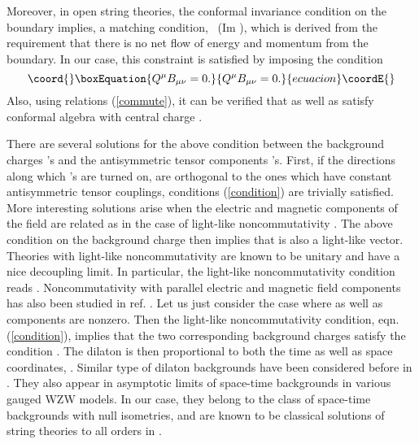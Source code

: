\documentclass[a4paper,12pt]{article}
\begin{document}
Moreover, in open string theories, the conformal invariance condition 
on the boundary implies, a matching 
condition, \coordHE{} ~(Im \coordHE{}), 
which is
derived from the requirement that there is no net flow of 
energy and momentum from the boundary.
In our case, this constraint 
is satisfied by imposing the condition 
\begin{equation}\coord{}\boxEquation{
Q^{\mu} B_{\mu \nu} = 0.
\label{condition}
}{
Q^{\mu} B_{\mu \nu} = 0.
}{ecuacion}\coordE{}\end{equation} 
Also, using relations (\ref{commute}), 
it can be verified that \coordHE{} as well as \coordHE{} 
satisfy conformal algebra with central charge 
\coordHE{}. 

There are several solutions for the above condition between the 
background charges \coordHE{}'s and the antisymmetric tensor 
components \coordHE{}'s.  First, if the directions along which 
\coordHE{}'s are turned on, are orthogonal to the ones which have 
constant antisymmetric tensor couplings, conditions (\ref{condition}) are
trivially satisfied.  More interesting solutions arise 
when the electric and magnetic components of the \coordHE{} field are related as 
in the case of light-like noncommutativity \cite{aharony}.
The above condition on the background charge then implies that 
\coordHE{} is also a light-like vector. 
Theories with light-like noncommutativity are known to be 
unitary \cite{gomis} and have a nice decoupling limit. 
In particular, the light-like noncommutativity condition reads 
\coordHE{}. Noncommutativity with parallel electric 
and magnetic field components has also been studied in ref. 
\cite{jabbari}. Let us just consider the case where 
\coordHE{} as well as \coordHE{} components are nonzero. 
Then the light-like noncommutativity condition, 
eqn. (\ref{condition}), implies that the two corresponding
background charges satisfy the condition \coordHE{}.
The dilaton is then proportional to both the time as well
as space coordinates, \coordHE{}  \coordHE{}.
Similar type of dilaton backgrounds have been considered before
in \cite{bershadsky}. They also appear in asymptotic limits 
of space-time backgrounds in various gauged WZW models.
In our case, they belong to the  class of 
space-time backgrounds with null isometries\cite{chiral}, and 
are known to be classical solutions of string theories to all 
orders in \coordHE{}. 
 
\end{document}
